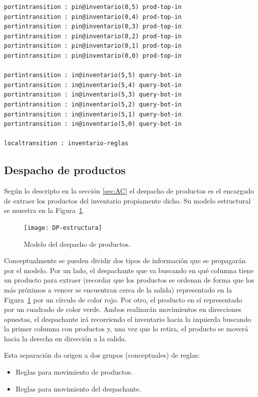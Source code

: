 \documentclass[10pt]{article}
\begin{document}
\begin{minipage}{1\textwidth}
\begin{lstlisting}
portintransition : pin@inventario(0,5) prod-top-in
portintransition : pin@inventario(0,4) prod-top-in
portintransition : pin@inventario(0,3) prod-top-in
portintransition : pin@inventario(0,2) prod-top-in
portintransition : pin@inventario(0,1) prod-top-in
portintransition : pin@inventario(0,0) prod-top-in

portintransition : in@inventario(5,5) query-bot-in
portintransition : in@inventario(5,4) query-bot-in
portintransition : in@inventario(5,3) query-bot-in
portintransition : in@inventario(5,2) query-bot-in
portintransition : in@inventario(5,1) query-bot-in
portintransition : in@inventario(5,0) query-bot-in

localtransition : inventario-reglas
	\end{lstlisting}
\end{minipage}

\subsection{Despacho de productos}\label{sec:DP}
Según lo descripto en la sección \ref{sec:AC} el despacho de productos es el encargado de extraer los productos del inventario propiamente dicho.
Su modelo estructural se muestra en la Figura~\ref{fig:DP-estructura}.

\begin{figure}[h] 
	\centering 
	\texttt{[image: DP-estructura]} 
	\caption{Modelo del despacho de productos.} 
	\label{fig:DP-estructura} 
\end{figure}

Conceptualmente se pueden dividir dos tipos de información que se propagarán por el modelo. Por un lado, el despachante que va buscando en qué columna tiene un producto para extraer (recordar que los productos se ordenan de forma que los más próximos a vencer se encuentran cerca de la salida) representado en la Figura~\ref{fig:DP-estructura} por un círculo de color rojo. Por otro, el producto en sí representado por un cuadrado de color verde. Ambos realizarán movimientos en direcciones opuestas, el despachante irá recorriendo el inventario hacia la izquierda buscando la primer columna con productos y, una vez que lo retira, el producto se moverá hacia la derecha en dirección a la salida. 

Esta separación da origen a dos grupos (conceptuales) de reglas:
\begin{itemize}
	\item Reglas para movimiento de productos.
	\item Reglas para movimiento del despachante.
\end{itemize}
\end{document}
